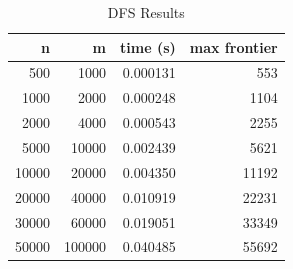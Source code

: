 \begin{table}[H]
\centering
\caption{DFS Results}
\begin{tabular}{rrrr}
\toprule
n & m & time (s) & max frontier\\
\midrule
500 & 1000 & 0.000131 & 553\\
1000 & 2000 & 0.000248 & 1104\\
2000 & 4000 & 0.000543 & 2255\\
5000 & 10000 & 0.002439 & 5621\\
10000 & 20000 & 0.004350 & 11192\\
20000 & 40000 & 0.010919 & 22231\\
30000 & 60000 & 0.019051 & 33349\\
50000 & 100000 & 0.040485 & 55692\\
\bottomrule
\end{tabular}
\end{table}
